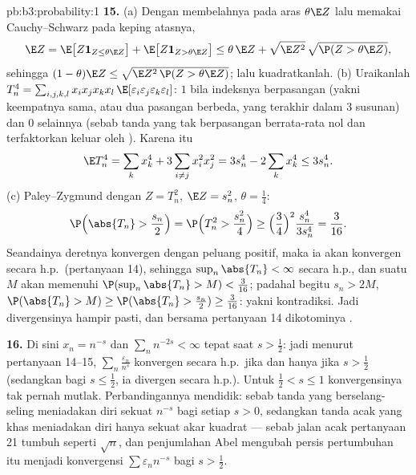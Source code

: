 \begin{solution}{pb:b3:probability:1}
\textbf{15.} (a) Dengan membelahnya pada aras $\theta\E Z$ lalu
memakai Cauchy--Schwarz pada keping atasnya,
\[
\E Z = \E\bigl[Z\mathbf 1_{Z \leq \theta\E Z}\bigr] +
\E\bigl[Z\mathbf 1_{Z > \theta\E Z}\bigr]
\leq \theta\,\E Z + \sqrt{\E Z^2}\,
\sqrt{\P(Z > \theta\E Z)} ,
\]
sehingga $(1 - \theta)\E Z \leq \sqrt{\E Z^2\,\P(Z > \theta\E
Z)}$; lalu kuadratkanlah. (b) Uraikanlah $T_n^4 =
\sum_{i,j,k,l}x_ix_jx_kx_l\,
\E[\varepsilon_i\varepsilon_j\varepsilon_k\varepsilon_l]$:
 $1$ bila indeksnya berpasangan (yakni keempatnya
sama, atau dua pasangan berbeda, yang terakhir dalam $3$
susunan) dan $0$ selainnya (sebab tanda yang tak berpasangan berrata-rata
nol dan terfaktorkan keluar oleh ). Karena itu
\[
\E T_n^4 = \sum_kx_k^4 + 3\sum_{i\neq j}x_i^2x_j^2 =
3s_n^4 - 2\sum_kx_k^4 \leq 3s_n^4 .
\]
(c) Paley--Zygmund dengan $Z = T_n^2$, $\E Z = s_n^2$,
$\theta = \frac14$:
\[
\P\Bigl(\abs{T_n} > \frac{s_n}2\Bigr) = \P\Bigl(T_n^2 >
\frac{s_n^2}4\Bigr) \geq \Bigl(\frac34\Bigr)^2
\frac{s_n^4}{3s_n^4} = \frac3{16} .
\]
Seandainya deretnya konvergen dengan peluang positif, maka ia
akan konvergen secara h.p.\ (pertanyaan 14), sehingga $\sup_n\abs{T_n} <
\infty$ secara h.p., dan suatu $M$ akan memenuhi
$\P(\sup_n\abs{T_n} > M) < \frac3{16}$; padahal begitu $s_n
> 2M$, $\P(\abs{T_n} > M) \geq \P(\abs{T_n} > \frac{s_n}2)
\geq \frac3{16}$: yakni kontradiksi. Jadi divergensinya hampir
pasti, dan bersama pertanyaan 14 dikotominya .

\textbf{16.} Di sini $x_n = n^{-s}$ dan $\sum_nn^{-2s} <
\infty$ tepat saat $s > \frac12$: jadi menurut pertanyaan 14--15,
$\sum_n\frac{\varepsilon_n}{n^s}$ konvergen secara h.p.\ jika dan
hanya jika $s > \frac12$ (sedangkan bagi $s \leq \frac12$, ia divergen
secara h.p.). Untuk $\frac12 < s \leq 1$ konvergensinya
tak pernah mutlak. Perbandingannya mendidik: sebab tanda yang berselang-seling
 meniadakan diri sekuat $n^{-s}$ bagi setiap $s
> 0$, sedangkan tanda acak yang khas meniadakan diri hanya sekuat
akar kuadrat --- sebab jalan acak pertanyaan 21
tumbuh seperti $\sqrt n$, dan penjumlahan Abel mengubah persis
pertumbuhan itu menjadi konvergensi $\sum\varepsilon_nn^{-s}$
bagi $s > \frac12$.


\end{solution}
